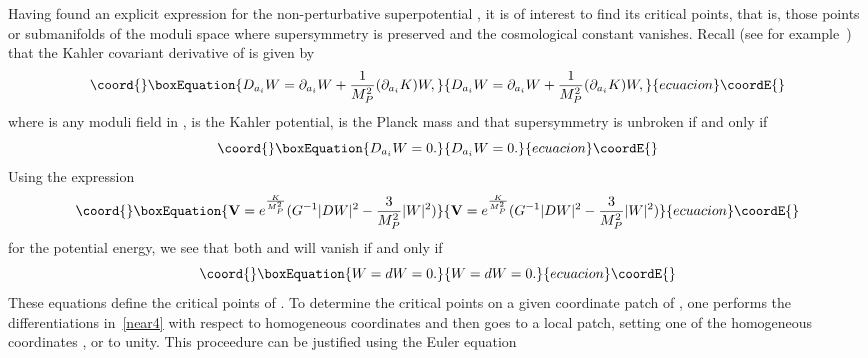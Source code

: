 \documentclass[a4paper,12pt]{article}
\numberwithin{equation}{section}
\theoremstyle{plain}
\begin{document}
Having found an explicit expression for the non-perturbative
superpotential
\coordHE{}, it is of interest to find its critical points, that is, those points
or
submanifolds of the moduli space \coordHE{} where \coordHE{} supersymmetry is preserved and the
cosmological constant vanishes. Recall (see
for example~\cite{WB}) that the Kahler covariant derivative of \coordHE{} is
given by
%
\begin{equation}\coord{}\boxEquation{
D_{a_{i}}W=\partial_{a_{i}}W+\frac{1}{M_{P}^{2}}(\partial_{a_{i}}K)W,
\label{near}
}{
D_{a_{i}}W=\partial_{a_{i}}W+\frac{1}{M_{P}^{2}}(\partial_{a_{i}}K)W,
}{ecuacion}\coordE{}\end{equation}
%
where \coordHE{} is any moduli field in \coordHE{}, \coordHE{} is the Kahler potential,
\coordHE{}
is the Planck mass and
that \coordHE{} supersymmetry is unbroken if and only if
%
\begin{equation}\coord{}\boxEquation{
D_{a_{i}}W=0.
\label{near2}
}{
D_{a_{i}}W=0.
}{ecuacion}\coordE{}\end{equation}
%
Using the expression
%
\begin{equation}\coord{}\boxEquation{
{\bf V
\rm}=e^{\frac{K}{M_{P}^{2}}}(G^{-1}|DW|^{2}-\frac{3}{M_{P}^{2}}|W|^{2})
\label{near3}
}{
{\bf V
\rm}=e^{\frac{K}{M_{P}^{2}}}(G^{-1}|DW|^{2}-\frac{3}{M_{P}^{2}}|W|^{2})
}{ecuacion}\coordE{}\end{equation}
%
for the potential energy, we see that both \coordHE{} and \coordHE{} will
vanish
if and only if
%
\begin{equation}\coord{}\boxEquation{
W=dW=0.
\label{near4}
}{
W=dW=0.
}{ecuacion}\coordE{}\end{equation}
%
These equations define the critical points of \coordHE{}.
To determine the critical points on a given coordinate patch
of \coordHE{}, one performs the
differentiations in~\eqref{near4} with respect to homogeneous coordinates
and then goes to a local patch,
setting one of the homogeneous coordinates \coordHE{}, \coordHE{} or \coordHE{}
to
unity. This proceedure can be justified using the Euler equation
\end{document}
